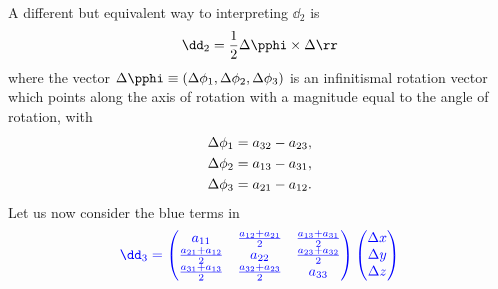 \documentclass{tufte-book} %
\begin{document}
A different but equivalent way to interpreting $\dd_2$ is 
\begin{equation}
\dd_2 = \frac{1}{2}\Delta \pphi \times \Delta \rr
\label{eq:rot}
\end{equation}
where the vector $\Delta \pphi \equiv (\Delta \phi_1,\Delta
\phi_2,\Delta \phi_3)$ is an infinitismal rotation vector
which points along the axis of rotation with a magnitude equal to the 
angle of rotation, with 
\begin{subequations}
\begin{align}
\Delta \phi_1 & =  a_{32}-a_{23} \/, \\
\Delta \phi_2 & =  a_{13}-a_{31} \/,\\
\Delta \phi_3 & =  a_{21}-a_{12} \/.
\end{align}
\end{subequations}
Let us now consider the blue terms in 
\begin{equation}
{\color{blue}\dd_3 = 
\begin{pmatrix}
a_{11} & \frac{a_{12}+a_{21}}{2} &
    \frac{a_{13}+a_{31}}{2}  \\
\frac{a_{21}+a_{12}}{2} &  a_{22} &
    \frac{a_{23}+a_{32}}{2}  \\
\frac{a_{31}+a_{13}}{2} &
    \frac{a_{32}+a_{23}}{2} & a_{33} 
\end{pmatrix}
\begin{pmatrix}
\Delta x \\ \Delta y  \\ \Delta z
\end{pmatrix}
}
\label{eq:sym}
\end{equation}
\end{document}
